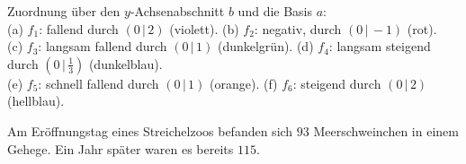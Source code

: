\documentclass[11pt]{exam}
\begin{document}
\begin{questions}
\begin{minipage}{0.45\linewidth}
\end{minipage}
{\begin{solution}
		Zuordnung über den $y$-Achsenabschnitt $b$ und die Basis $a$:\\
		(a) $f_1$: fallend durch $(0\,|\,2)$ (violett). \quad (b) $f_2$: negativ, durch $(0\,|\,-1)$ (rot).\\
		(c) $f_3$: langsam fallend durch $(0\,|\,1)$ (dunkelgrün). \quad (d) $f_4$: langsam steigend durch $(0\,|\,\frac{1}{3})$ (dunkelblau).\\
		(e) $f_5$: schnell fallend durch $(0\,|\,1)$ (orange). \quad (f) $f_6$: steigend durch $(0\,|\,2)$ (hellblau).
\end{solution}}
{}

\question[4]
Am Eröffnungstag eines Streichelzoos befanden sich $93$ Meerschweinchen in einem Gehege. Ein Jahr später waren es bereits $115$.
\end{questions}
\end{document}
